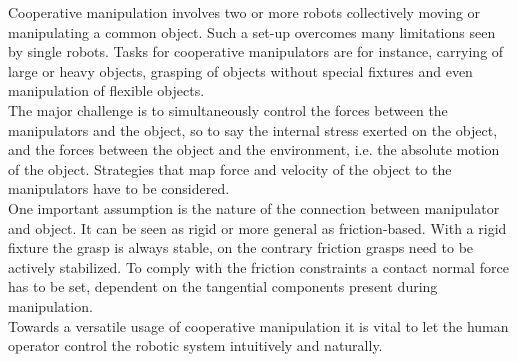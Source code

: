 \documentclass[a4paper,twoside, openright,12pt]{report}
\begin{document}
%
Cooperative manipulation involves two or more robots collectively moving or manipulating a common object. Such a set-up overcomes many limitations seen by single robots. Tasks for cooperative manipulators are for instance, carrying of large or heavy objects, grasping of objects without special fixtures and even manipulation of flexible objects.\\
The major challenge is to simultaneously control the forces between the manipulators and the object, so to say the internal stress exerted on the object, and the forces between the object and the environment, i.e. the absolute motion of the object.
Strategies that map force and velocity of the object to the manipulators have to be considered.\\
One important assumption is the nature of the connection between manipulator and object. It can be seen as rigid or more general as friction-based. With a rigid fixture the grasp is always stable, on the contrary friction grasps need to be actively stabilized. To comply with the friction constraints a contact normal force has to be set, dependent on the tangential components present during manipulation.\\
Towards a versatile usage of cooperative manipulation it is vital to let the human operator control the robotic system intuitively and naturally. 
\end{document}
